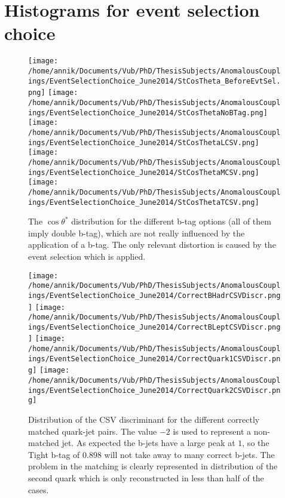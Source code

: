 \documentclass[a4paper,12pt]{report}
\begin{document}
\section{Histograms for event selection choice}
\begin{center}

\begin{figure}[!h]
 \texttt{[image: /home/annik/Documents/Vub/PhD/ThesisSubjects/AnomalousCouplings/EventSelectionChoice\_June2014/StCosTheta\_BeforeEvtSel.png]}
\texttt{[image: /home/annik/Documents/Vub/PhD/ThesisSubjects/AnomalousCouplings/EventSelectionChoice\_June2014/StCosThetaNoBTag.png]}
\texttt{[image: /home/annik/Documents/Vub/PhD/ThesisSubjects/AnomalousCouplings/EventSelectionChoice\_June2014/StCosThetaLCSV.png]}
\texttt{[image: /home/annik/Documents/Vub/PhD/ThesisSubjects/AnomalousCouplings/EventSelectionChoice\_June2014/StCosThetaMCSV.png]}
\texttt{[image: /home/annik/Documents/Vub/PhD/ThesisSubjects/AnomalousCouplings/EventSelectionChoice\_June2014/StCosThetaTCSV.png]}
\caption{The $\cos \theta^{*}$ distribution for the different b-tag options (all of them imply double b-tag), which are not really influenced by the application of a b-tag. The only relevant distortion is caused by the event selection which is applied.}
\end{figure}

\begin{figure}[!h]
 \texttt{[image: /home/annik/Documents/Vub/PhD/ThesisSubjects/AnomalousCouplings/EventSelectionChoice\_June2014/CorrectBHadrCSVDiscr.png]}
\texttt{[image: /home/annik/Documents/Vub/PhD/ThesisSubjects/AnomalousCouplings/EventSelectionChoice\_June2014/CorrectBLeptCSVDiscr.png]}
\texttt{[image: /home/annik/Documents/Vub/PhD/ThesisSubjects/AnomalousCouplings/EventSelectionChoice\_June2014/CorrectQuark1CSVDiscr.png]}
\texttt{[image: /home/annik/Documents/Vub/PhD/ThesisSubjects/AnomalousCouplings/EventSelectionChoice\_June2014/CorrectQuark2CSVDiscr.png]}
\caption{Distribution of the CSV discriminant for the different correctly matched quark-jet pairs. The value $-2$ is used to represent a non-matched jet. As expected the b-jets have a large peak at $1$, so the Tight b-tag of 0.898 will not take away to many correct b-jets. The problem in the matching is clearly represented in distribution of the second quark which is only reconstructed in less than half of the cases.}
\end{figure}


\end{center}
\end{document}
